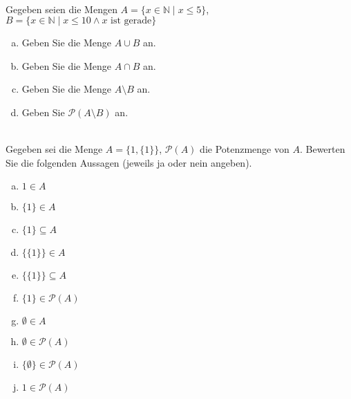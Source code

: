 \newcommand{\printpraesenzlsg}{false}
\newcommand{\printloesungen}{false}
\newcommand{\printbewertungen}{false}
\newcommand{\blattnummer}{1}




\iforiginal{}
\\
Gegeben seien die Mengen $A=\{x\in\mathbb{N}\mid x\leq 5\}$, $B=\{x\in\mathbb{N}\mid x\leq 10\wedge x \mbox{ ist gerade}\}$
\begin{enumerate}[(a)]
\item Geben Sie die Menge $A\cup B$ an.
\item Geben Sie die Menge $A\cap B$ an.
\item Geben Sie die Menge $A\setminus B$ an.
\item Geben Sie $\mathscr{P}(A\setminus B)$ an.

\end{enumerate}

\\
Gegeben sei die Menge $A=\{1,\{1\}\}$, $\mathscr{P}(A)$ die Potenzmenge von $A$. Bewerten Sie die folgenden Aussagen (jeweils ja oder nein angeben).
\begin{enumerate}[(a)]
\item $1\in A$
\item $\{1\}\in A$
\item $\{1\}\subseteq A$
\item $\{\{1\}\}\in A$
\item $\{\{1\}\}\subseteq A$
\item $\{1\}\in\mathscr{P}(A)$
\item $\emptyset\in A$
\item $\emptyset\in\mathscr{P}(A)$
\item $\{\emptyset\}\in\mathscr{P}(A)$
\item $1\in\mathscr{P}(A)$
\end{enumerate}

